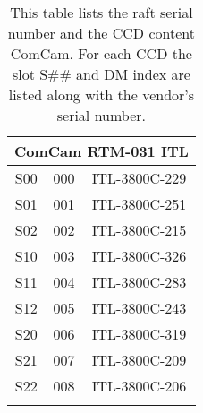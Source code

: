 \begin{longtable}{ccc}
\multicolumn{3}{c}{\bf ComCam  RTM-031  ITL} \\
\hline
  S00 & 000 & ITL-3800C-229 \\
  S01 & 001 & ITL-3800C-251 \\
  S02 & 002 & ITL-3800C-215 \\
  S10 & 003 & ITL-3800C-326 \\
  S11 & 004 & ITL-3800C-283 \\
  S12 & 005 & ITL-3800C-243 \\
  S20 & 006 & ITL-3800C-319 \\
  S21 & 007 & ITL-3800C-209 \\
  S22 & 008 & ITL-3800C-206 \\

    \caption{This table lists the raft serial number and the CCD content ComCam.  For each CCD the slot S\#\# and DM index are listed along with the vendor's serial number.}
    \label{tab:comcam_mapping}
\end{longtable}
